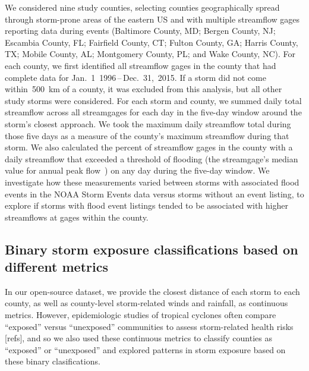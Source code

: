 We considered nine study counties, selecting counties geographically spread
through storm-prone areas of the eastern \ac{US} and with multiple streamflow
gages reporting data during events (Baltimore County, MD; Bergen County, NJ;
Escambia County, FL; Fairfield County, CT; Fulton County, GA; Harris County,
TX; Mobile County, AL; Montgomery County, PL; and Wake County, NC). For each
county, we first identified all streamflow gages in the county that had
complete data for Jan.~1~1996\,--\,Dec.~31,~2015. If a storm did not come
within~500~\si{\kilo\metre} of a county, it was excluded from this analysis,
but all other study storms were considered. For each storm and county, we
summed daily total streamflow across all streamgages for each day in the
five-day window around the storm's closest approach. We took the maximum daily
streamflow total during those five days as a measure of the county's maximum
streamflow during that storm. We also calculated the percent of streamflow
gages in the county with a daily streamflow that exceeded a threshold of
flooding (the streamgage's median value for annual peak
flow~\parencite{countyfloods}) on any day during the five-day window. We
investigate how these measurements varied between storms with associated flood
events in the NOAA Storm Events data versus storms without an event listing, to
explore if storms with flood event listings tended to be  associated with
higher streamflows at gages within the county.

\subsection*{Binary storm exposure classifications based on different metrics}

In our open-source dataset, we provide the closest distance of each storm to
each county, as well as county-level storm-related winds and rainfall, as
continuous metrics. However, epidemiologic studies of tropical cyclones often
compare ``exposed'' versus ``unexposed'' communities to assess storm-related
health risks [refs], and so we also used these continuous metrics to classify
counties as ``exposed'' or ``unexposed'' and explored patterns in storm
exposure based on these binary clasifications. 

